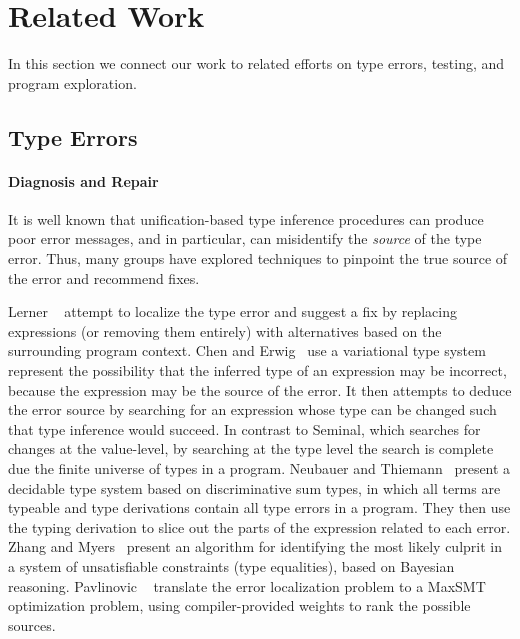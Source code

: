 \section{Related Work}
\label{sec:related-work}
In this section we connect our work to related efforts on type errors,
testing, and program exploration.

\subsection{Type Errors}
\label{sec:type-error}

\paragraph{Diagnosis and Repair}
\label{sec:diagnosis-repair}
It is well known that unification-based type inference procedures can
produce poor error messages, and in particular, can misidentify the
\emph{source} of the type error.
%
Thus, many groups have explored techniques to pinpoint the true source
of the error and recommend fixes.

Lerner \etal~\cite{lerner_searching_2007} attempt to localize the type
error and suggest a fix by replacing expressions (or removing them
entirely) with alternatives based on the surrounding program context.
%
Chen and Erwig~\cite{chen_counter-factual_2014} use a variational type
system represent the possibility that the inferred type of an expression
may be incorrect, because the expression may be the source of the
error. It then attempts to deduce the error source by searching for an
expression whose type can be changed such that type inference would
succeed. In contrast to Seminal, which searches for changes at the
value-level, by searching at the type level the search is complete due
the finite universe of types in a program.
%
Neubauer and Thiemann~\cite{neubauer_discriminative_2003} present a
decidable type system based on discriminative sum types, in which all
terms are typeable and type derivations contain all type errors in a
program. They then use the typing derivation to slice out the parts of
the expression related to each error.
%
Zhang and Myers~\cite{zhang_toward_2014} present an algorithm for
identifying the most likely culprit in a system of unsatisfiable
constraints (\eg type equalities), based on Bayesian reasoning.
%
Pavlinovic \etal~\cite{pavlinovic_finding_2014} translate the error
localization problem to a MaxSMT optimization problem, using
compiler-provided weights to rank the possible sources.

